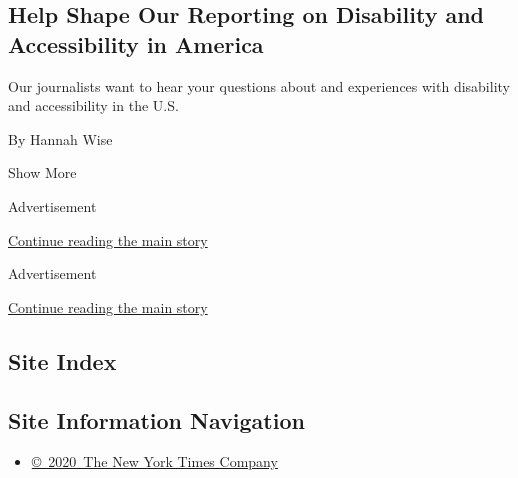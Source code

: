 \begin{enumerate}
  \hypertarget{help-shape-our-reporting-on-disability-and-accessibility-in-america}{%
  \subsection{Help Shape Our Reporting on Disability and Accessibility
  in
  America}\label{help-shape-our-reporting-on-disability-and-accessibility-in-america}}

  Our journalists want to hear your questions about and experiences with
  disability and accessibility in the U.S.

  By Hannah Wise
\end{enumerate}

Show More

Advertisement

\protect\hyperlink{after-mid4}{Continue reading the main story}

Advertisement

\protect\hyperlink{after-mktg}{Continue reading the main story}

\hypertarget{site-index}{%
\subsection{Site Index}\label{site-index}}

\hypertarget{site-information-navigation}{%
\subsection{Site Information
Navigation}\label{site-information-navigation}}

\begin{itemize}
\tightlist
\item
  \href{https://help.nytimes.com/hc/en-us/articles/115014792127-Copyright-notice}{©~2020~The
  New York Times Company}
\end{itemize}

